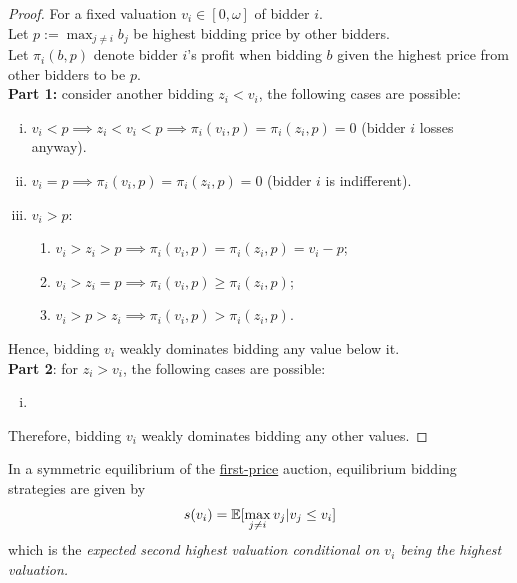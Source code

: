 \documentclass{book}
\begin{document}
	\begin{proof}
		For a fixed valuation $v_i \in [0, \omega]$ of bidder $i$. \\
		Let $p := \max_{j \neq i} b_j$ be highest bidding price by other bidders. \\
		Let $\pi_i(b, p)$ denote bidder $i$'s profit when bidding $b$ given the highest price from other bidders to be $p$. \\
		\textbf{Part 1:} consider another bidding $z_i < v_i$, the following cases are possible: 
		\begin{enumerate}[(i)]
			\item $v_i < p \implies z_i < v_i < p \implies \pi_i(v_i, p) = \pi_i(z_i, p) = 0$ (bidder $i$ losses anyway).
			\item $v_i = p \implies \pi_i(v_i, p) = \pi_i(z_i, p) = 0$ (bidder $i$ is indifferent).
			\item $v_i > p$:
			\begin{enumerate}
				\item $v_i > z_i > p \implies \pi_i(v_i, p) = \pi_i(z_i, p) = v_i - p$;
				\item $v_i > z_i = p \implies \pi_i(v_i, p) \geq \pi_i(z_i, p)$;
				\item $v_i > p > z_i \implies \pi_i(v_i, p) > \pi_i(z_i, p)$.
			\end{enumerate}
		\end{enumerate}
		Hence, bidding $v_i$ weakly dominates bidding any value below it. \\
		\textbf{Part 2}: for $z_i > v_i$, the following cases are possible:
		\begin{enumerate}[(i)]
			\item {}
		\end{enumerate}
		Therefore, bidding $v_i$ weakly dominates bidding any other values.
	\end{proof}
	
	\begin{proposition}
		In a symmetric equilibrium of the \ul{first-price} auction, equilibrium bidding strategies are given by
		\begin{align}
			s(v_i) = \mathbb{E}[{\max_{j \neq i} v_j | v_j \leq v_i}]
		\end{align}
		which is the \emph{expected second highest valuation conditional on $v_i$ being the highest valuation.}
	\end{proposition}
	
\end{document}
